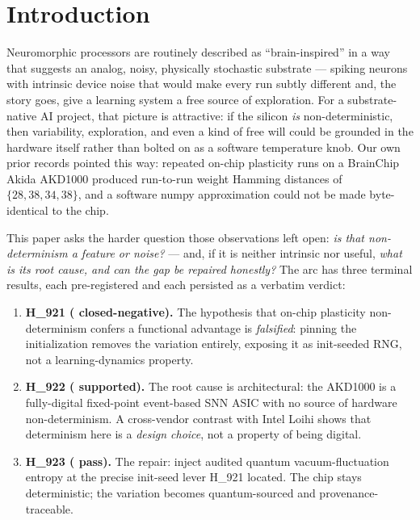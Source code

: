 \documentclass[11pt,a4paper]{article}
\providecommand{\tierGreen}{🟢}
\providecommand{\tierRed}{🔴}
\renewcommand{\tierGreen}{{\color{green!55!black}\textbullet}}
\renewcommand{\tierRed}{{\color{red!75!black}\textbullet}}
\begin{document}
\section{Introduction}
\label{sec:intro}

Neuromorphic processors are routinely described as ``brain-inspired'' in a
way that suggests an analog, noisy, physically stochastic substrate ---
spiking neurons with intrinsic device noise that would make every run
subtly different and, the story goes, give a learning system a free source
of exploration. For a substrate-native AI project, that picture is
attractive: if the silicon \emph{is} non-deterministic, then variability,
exploration, and even a kind of free will could be grounded in the hardware
itself rather than bolted on as a software temperature knob. Our own prior
records pointed this way: repeated on-chip plasticity runs on a BrainChip
Akida AKD1000 produced run-to-run weight Hamming distances of
\(\{28, 38, 34, 38\}\), and a software numpy approximation could not be
made byte-identical to the chip.

This paper asks the harder question those observations left open:
\emph{is that non-determinism a feature or noise?} ---
and, if it is neither intrinsic nor useful, \emph{what is its root cause,
and can the gap be repaired honestly?} The arc has three terminal results,
each pre-registered and each persisted as a verbatim verdict:

\begin{enumerate}\itemsep0.3em
\item \textbf{H\_921 (\tierRed{} closed-negative).} The hypothesis that
on-chip plasticity non-determinism confers a functional advantage is
\emph{falsified}: pinning the initialization removes the variation
entirely, exposing it as init-seeded RNG, not a learning-dynamics property.
\item \textbf{H\_922 (\tierGreen{} supported).} The root cause is
architectural: the AKD1000 is a fully-digital fixed-point event-based SNN
ASIC with no source of hardware non-determinism. A cross-vendor contrast
with Intel Loihi shows that determinism here is a \emph{design choice}, not
a property of being digital.
\item \textbf{H\_923 (\tierGreen{} pass).} The repair: inject audited
quantum vacuum-fluctuation entropy at the precise init-seed lever H\_921
located. The chip stays deterministic; the variation becomes
quantum-sourced and provenance-traceable.
\end{enumerate}
\end{document}
